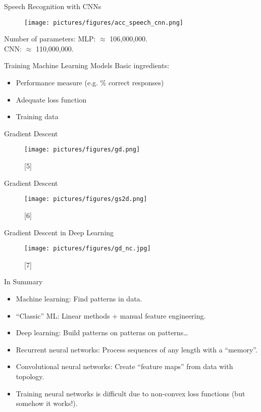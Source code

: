 \documentclass{beamer}
\begin{document}
\begin{frame}{Speech Recognition with CNNs}
\begin{figure}
\texttt{[image: pictures/figures/acc\_speech\_cnn.png]}
\end{figure}
Number of parameters: MLP: $\approx$ 106,000,000.\\ CNN: $\approx$ 110,000,000.
\end{frame}


\begin{frame}{Training Machine Learning Models}
Basic ingredients:
\begin{itemize}
\item Performance measure (e.g. \% correct responses)
\item Adequate loss function
\item Training data
\end{itemize}
\end{frame}


\begin{frame}{Gradient Descent}
\begin{figure}
\texttt{[image: pictures/figures/gd.png]}
\caption*{[5]}
\end{figure}
\end{frame}


\begin{frame}{Gradient Descent}
\begin{figure}
\texttt{[image: pictures/figures/gs2d.png]}
\caption*{[6]}
\end{figure}
\end{frame}


\begin{frame}{Gradient Descent in Deep Learning}
\begin{figure}
\texttt{[image: pictures/figures/gd\_nc.jpg]}
\caption*{[7]}
\end{figure}
\end{frame}


\begin{frame}{In Summary}
\begin{itemize}
\item Machine learning: Find patterns in data.
\item ``Classic'' ML: Linear methods + manual feature engineering.
\item Deep learning: Build patterns on patterns on patterns\ldots
\item Recurrent neural networks: Process sequences of any length with a ``memory''.
\item Convolutional neural networks: Create ``feature maps'' from data with topology.
\item Training neural networks is difficult due to non-convex loss functions (but somehow it works!).
\end{itemize}
\end{frame}
\end{document}
